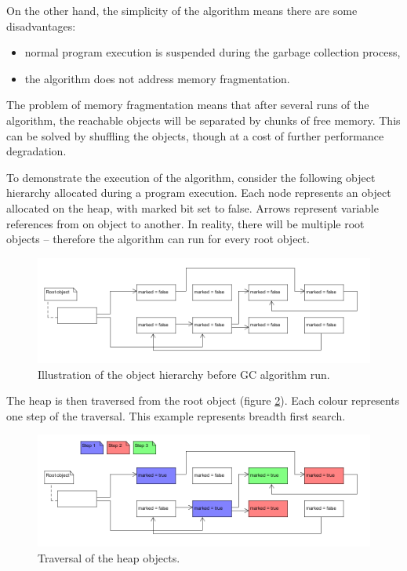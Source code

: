 \documentclass[thesis=M,english]{FITthesis}[2019/12/23]
\begin{document}
On the other hand, the simplicity of the algorithm means there are some disadvantages:
\begin{itemize}
	\item normal program execution is suspended during the garbage collection process,
	\item the algorithm does not address memory fragmentation.
\end{itemize}

The problem of memory fragmentation means that after several runs of the algorithm, the reachable objects will be separated
by chunks of free memory. This can be solved by shuffling the objects, though at a cost of further performance degradation.

To demonstrate the execution of the algorithm, consider the following object hierarchy allocated during a program execution.
Each node represents an object allocated on the heap, with marked bit set to false. Arrows represent variable references
from on object to another. In reality, there will be multiple root objects -- therefore the algorithm can run for every
root object.

\begin{figure}[h!]
	\centering
	\includegraphics[width=\textwidth]{media/gc_ms_step1.png}
	\caption{Illustration of the object hierarchy before GC algorithm run.}
	\label{fig:gc_step1}
\end{figure}

The heap is then traversed from the root object (figure \ref{fig:gc_step2}). Each colour represents one step of the traversal. This example represents
breadth first search.

\begin{figure}[h!]
	\centering
	\includegraphics[width=\textwidth]{media/gc_ms_step2color.png}
	\caption{Traversal of the heap objects.}
	\label{fig:gc_step2}
\end{figure}
\end{document}
